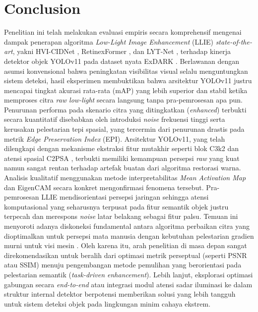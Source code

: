 \documentclass[conference]{IEEEtran}
\begin{document}
\section{Conclusion}
Penelitian ini telah melakukan evaluasi empiris secara komprehensif mengenai dampak penerapan algoritma \textit{Low-Light Image Enhancement} (LLIE) \textit{state-of-the-art}, yakni HVI-CIDNet \cite{yan2025hvi}, RetinexFormer \cite{cai2023retinexformer}, dan LYT-Net \cite{brateanu2025lytnet}, terhadap kinerja detektor objek YOLOv11 pada dataset nyata ExDARK \cite{loh2019exdark}. Berlawanan dengan asumsi konvensional bahwa peningkatan visibilitas visual selalu menguntungkan sistem deteksi, hasil eksperimen membuktikan bahwa arsitektur YOLOv11 justru mencapai tingkat akurasi rata-rata (mAP) yang lebih superior dan stabil ketika memproses citra \textit{raw low-light} secara langsung tanpa pra-pemrosesan apa pun.
Penurunan performa pada skenario citra yang ditingkatkan (\textit{enhanced}) terbukti secara kuantitatif disebabkan oleh introduksi \textit{noise} frekuensi tinggi serta kerusakan pelestarian tepi spasial, yang tercermin dari penurunan drastis pada metrik \textit{Edge Preservation Index} (EPI). Arsitektur YOLOv11, yang telah dilengkapi dengan mekanisme ekstraksi fitur mutakhir seperti blok C3k2 dan atensi spasial C2PSA \cite{khanam2024yolov11}, terbukti memiliki kemampuan persepsi \textit{raw} yang kuat namun sangat rentan terhadap artefak buatan dari algoritma restorasi warna. Analisis kualitatif menggunakan metode interpretabilitas \textit{Mean Activation Map} dan EigenCAM \cite{metrics2026formulas} secara konkret mengonfirmasi fenomena tersebut. Pra-pemrosesan LLIE mendisorientasi persepsi jaringan sehingga atensi komputasional yang seharusnya terpusat pada fitur semantik objek justru terpecah dan merespons \textit{noise} latar belakang sebagai fitur palsu.
Temuan ini menyoroti adanya diskoneksi fundamental antara algoritma perbaikan citra yang dioptimalkan untuk persepsi mata manusia dengan kebutuhan pelestarian gradien murni untuk visi mesin \cite{wu2024llieeffect}. Oleh karena itu, arah penelitian di masa depan sangat direkomendasikan untuk beralih dari optimasi metrik perseptual (seperti PSNR atau SSIM) menuju pengembangan metode pemulihan yang berorientasi pada pelestarian semantik (\textit{task-driven enhancement}). Lebih lanjut, eksplorasi optimasi gabungan secara \textit{end-to-end} atau integrasi modul atensi sadar iluminasi ke dalam struktur internal detektor berpotensi memberikan solusi yang lebih tangguh untuk sistem deteksi objek pada lingkungan minim cahaya ekstrem.


\end{document}
